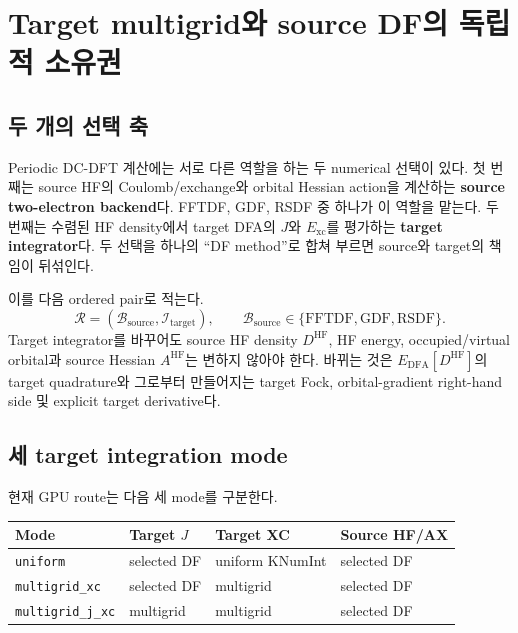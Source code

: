 \section{Target multigrid와 source DF의 독립적 소유권}
\label{sec:target-multigrid}

\subsection{두 개의 선택 축}

Periodic DC-DFT 계산에는 서로 다른 역할을 하는 두 numerical 선택이 있다. 첫 번째는
source HF의 Coulomb/exchange와 orbital Hessian action을 계산하는
\textbf{source two-electron backend}다. FFTDF, GDF, RSDF 중 하나가 이 역할을 맡는다.
두 번째는 수렴된 HF density에서 target DFA의 $J$와 $E_{\mathrm{xc}}$를 평가하는
\textbf{target integrator}다. 두 선택을 하나의 ``DF method''로 합쳐 부르면 source와
target의 책임이 뒤섞인다.

이를 다음 ordered pair로 적는다.
\begin{equation}
  \mathcal R
  =\left(\mathcal B_{\mathrm{source}},\mathcal I_{\mathrm{target}}\right),
  \qquad
  \mathcal B_{\mathrm{source}}\in\{\mathrm{FFTDF},\mathrm{GDF},\mathrm{RSDF}\}.
  \label{eq:target-owner-split}
\end{equation}
Target integrator를 바꾸어도 source HF density $D^{\mathrm{HF}}$, HF energy, occupied/virtual
orbital과 source Hessian $A^{\mathrm{HF}}$는 변하지 않아야 한다. 바뀌는 것은
$E_{\mathrm{DFA}}[D^{\mathrm{HF}}]$의 target quadrature와 그로부터 만들어지는 target
Fock, orbital-gradient right-hand side 및 explicit target derivative다.

\subsection{세 target integration mode}

현재 GPU route는 다음 세 mode를 구분한다.

\begin{center}
\begin{longtable}{p{}p{}p{}p{}}
\toprule
Mode & Target $J$ & Target XC & Source HF/AX \\
\midrule
\texttt{uniform} & selected DF & uniform KNumInt & selected DF \\
\texttt{multigrid\_xc} & selected DF & multigrid & selected DF \\
\texttt{multigrid\_j\_xc} & multigrid & multigrid & selected DF \\
\bottomrule
\end{longtable}
\end{center}

